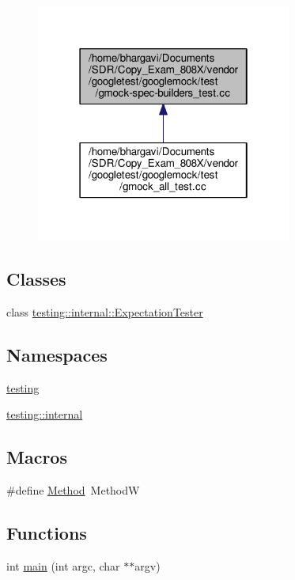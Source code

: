 \begin{figure}[H]
\begin{center}
\leavevmode
\includegraphics[width=238pt]{gmock-spec-builders__test_8cc__dep__incl}
\end{center}
\end{figure}
\subsection*{Classes}
\begin{DoxyCompactItemize}
\item 
class \hyperlink{classtesting_1_1internal_1_1_expectation_tester}{testing\+::internal\+::\+Expectation\+Tester}
\end{DoxyCompactItemize}
\subsection*{Namespaces}
\begin{DoxyCompactItemize}
\item 
 \hyperlink{namespacetesting}{testing}
\item 
 \hyperlink{namespacetesting_1_1internal}{testing\+::internal}
\end{DoxyCompactItemize}
\subsection*{Macros}
\begin{DoxyCompactItemize}
\item 
\#define \hyperlink{gmock-spec-builders__test_8cc_a95606368148f3e5aab5db46c32466afd}{Method}~MethodW
\end{DoxyCompactItemize}
\subsection*{Functions}
\begin{DoxyCompactItemize}
\item 
int \hyperlink{gmock-spec-builders__test_8cc_a3c04138a5bfe5d72780bb7e82a18e627}{main} (int argc, char $\ast$$\ast$argv)
\end{DoxyCompactItemize}


